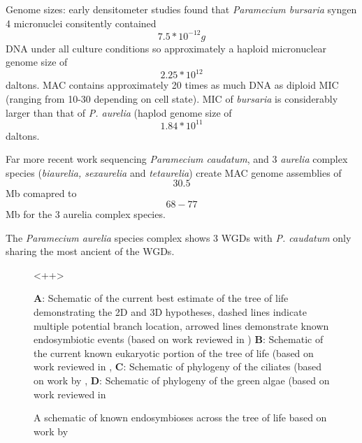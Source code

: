 Genome sizes: early densitometer studies found that \textit{Paramecium bursaria} syngen 4 
micronuclei consitently contained \[ 7.5*10^{-12}g \] DNA under all culture conditions so 
approximately a haploid micronuclear genome size of \[ 2.25*10^{12}\] daltons.
MAC contains approximately 20 times as much DNA as diploid MIC (ranging from 10-30
depending on cell state).
MIC of \textit{bursaria} is considerably larger than that of \textit{P. aurelia}
(haplod genome size of \[ 1.84*10^{11} \] daltons.
\citep{Cullis1972}

Far more recent work sequencing \textit{Paramecium caudatum}, 
and 3 \textit{aurelia} complex species (\textit{biaurelia, sexaurelia} and \textit{tetaurelia})
create MAC genome assemblies of \[30.5\] Mb comapred to \[68-77\] Mb for the 3 aurelia complex species.
\citep{McGrath2014}


The \textit{Paramecium aurelia} species complex shows 3 WGDs with \textit{P. caudatum}
only sharing the most ancient of the WGDs.

\citep{McGrath2014}




\begin{figure}
    \caption{\textbf{A}: Schematic of the current best estimate of the tree of life demonstrating the 2D and 3D hypotheses,
dashed lines indicate multiple potential branch location, arrowed lines demonstrate known endosymbiotic events (based on work reviewed in \citep{Gribaldo2010})
\textbf{B}: Schematic of the current known eukaryotic portion of the tree of life (based on work reviewed in \citep{Burki2014,Adl2013},
\textbf{C}: Schematic of phylogeny of the ciliates (based on work by \citep{Bachvaroff2011,},
\textbf{D}: Schematic of phylogeny of the green algae (based on work reviewed in \citep{Leliaert2012,}}
    <++>
\end{figure}

\begin{figure}
    \caption{A schematic of known endosymbioses across the tree of life based on work by \citep{Gribaldo2010,Wrede2012,vonDohlen2001}}
\end{figure}
%
%
%
%
%


